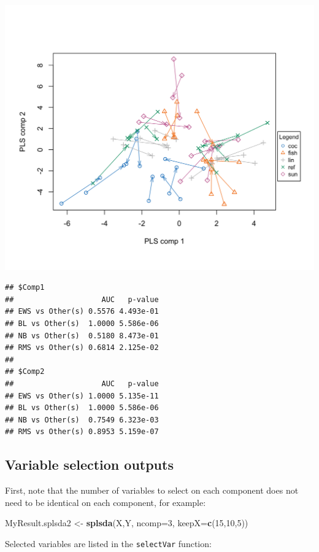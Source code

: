 \documentclass[]{book}
\newenvironment{Shaded}{\begin{snugshade}}{\end{snugshade}}
\newcommand{\KeywordTok}[1]{\textcolor[rgb]{0.13,0.29,0.53}{\textbf{#1}}}
\newcommand{\DataTypeTok}[1]{\textcolor[rgb]{0.13,0.29,0.53}{#1}}
\newcommand{\DecValTok}[1]{\textcolor[rgb]{0.00,0.00,0.81}{#1}}
\newcommand{\StringTok}[1]{\textcolor[rgb]{0.31,0.60,0.02}{#1}}
\newcommand{\OperatorTok}[1]{\textcolor[rgb]{0.81,0.36,0.00}{\textbf{#1}}}
\newcommand{\NormalTok}[1]{#1}
\theoremstyle{definition}
\theoremstyle{definition}
\theoremstyle{definition}
\theoremstyle{remark}
\begin{document}
\begin{center}\includegraphics[width=0.5\linewidth]{Figures/unnamed-chunk-8-1} \end{center}

\begin{verbatim}
## $Comp1
##                    AUC   p-value
## EWS vs Other(s) 0.5576 4.493e-01
## BL vs Other(s)  1.0000 5.586e-06
## NB vs Other(s)  0.5180 8.473e-01
## RMS vs Other(s) 0.6814 2.125e-02
## 
## $Comp2
##                    AUC   p-value
## EWS vs Other(s) 1.0000 5.135e-11
## BL vs Other(s)  1.0000 5.586e-06
## NB vs Other(s)  0.7549 6.323e-03
## RMS vs Other(s) 0.8953 5.159e-07
\end{verbatim}

\subsection{Variable selection
outputs}\label{variable-selection-outputs}

First, note that the number of variables to select on each component
does not need to be identical on each component, for example:

\begin{Shaded}
\begin{Highlighting}[]
\NormalTok{MyResult.splsda2 <-}\StringTok{ }\KeywordTok{splsda}\NormalTok{(X,Y, }\DataTypeTok{ncomp=}\DecValTok{3}\NormalTok{, }\DataTypeTok{keepX=}\KeywordTok{c}\NormalTok{(}\DecValTok{15}\NormalTok{,}\DecValTok{10}\NormalTok{,}\DecValTok{5}\NormalTok{))}
\end{Highlighting}
\end{Shaded}

Selected variables are listed in the \texttt{selectVar} function:

\begin{Shaded}
\end{Shaded}
\end{document}
